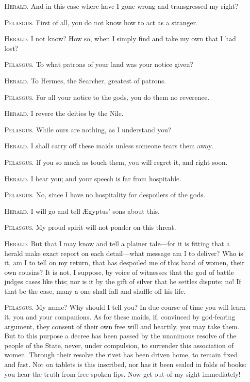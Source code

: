 \documentclass[12pt]{article}
\begin{document}
\textsc{Herald.} And in this case where have I gone wrong and transgressed my right?

\textsc{Pelasgus.} First of all, you do not know how to act as a stranger.

\textsc{Herald.} I not know? How so, when I simply find and take my own that I had lost?

\textsc{Pelasgus.} To what patrons of your land was your notice given?

\textsc{Herald.} To Hermes, the Searcher, greatest of patrons.

\textsc{Pelasgus.} For all your notice to the gods, you do them no reverence.

\textsc{Herald.} I revere the deities by the Nile.

\textsc{Pelasgus.} While ours are nothing, as I understand you?

\textsc{Herald.} I shall carry off these maids unless someone tears them away.

\textsc{Pelasgus.} If you so much as touch them, you will regret it, and right soon.

\textsc{Herald.} I hear you; and your speech is far from hospitable.

\textsc{Pelasgus.} No, since I have no hospitality for despoilers of the gods.

\textsc{Herald.} I will go and tell {\AE}gyptus' sons about this.

\textsc{Pelasgus.} My proud spirit will not ponder on this threat.

\textsc{Herald.} But that I may know and tell a plainer tale---for it is fitting that a herald make exact report on each detail---what message am I to deliver? Who is it, am I to tell on my return, that has despoiled me of this band of women, their own cousins? It is not, I suppose, by voice of witnesses that the god of battle judges cases like this; nor is it by the gift of silver that he settles dispute; no! If that be the case, many a one shall fall and shuffle off his life.

\textsc{Pelasgus.} My name? Why should I tell you? In due course of time you will learn it, you and your companions. As for these maids, if, convinced by god-fearing argument, they consent of their own free will and heartily, you may take them. But to this purpose a decree has been passed by the unanimous resolve of the people of the State, never, under compulsion, to surrender this association of women. Through their resolve the rivet has been driven home, to remain fixed and fast. Not on tablets is this inscribed, nor has it been sealed in folds of books: you hear the truth from free-spoken lips. Now get out of my sight immediately!
\end{document}
